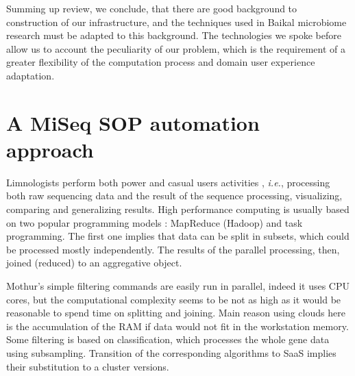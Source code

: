 \documentclass[a4paper]{jpconf}
\begin{document}
Summing up review, we conclude, that there are good background to construction of our infrastructure, and the techniques used in Baikal microbiome research must be adapted to this background. The technologies we spoke before allow us to account the peculiarity of our problem, which is the requirement of a greater flexibility of the computation process and domain user experience adaptation.







\section{A MiSeq SOP automation approach}
\label{sec:proc-mod}

Limnologists perform both power and casual users activities \cite{guo16}, \emph{i.e.}, processing both raw sequencing data and the result of the sequence processing, visualizing, comparing and generalizing results. High performance computing is usually based on two popular programming models \cite{guo16}: MapReduce (Hadoop) and task programming. The first one implies that data can be split in subsets, which could be processed mostly independently. The results of the parallel processing, then, joined (reduced) to an aggregative object.

 Mothur's simple filtering commands are easily run in parallel, indeed it uses CPU cores, but the computational complexity seems to be not as high as it would be reasonable to spend time on splitting and joining.  Main reason using clouds here is the accumulation of the RAM if data would not fit in the workstation memory. %
Some filtering is based on classification, which processes the whole gene data using subsampling.  Transition of the corresponding algorithms to SaaS implies their substitution to a cluster versions.
\end{document}
